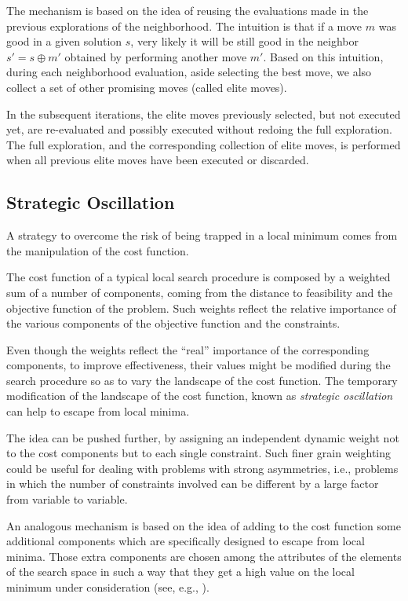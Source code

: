 The mechanism is based on the idea of reusing the evaluations made in the
previous explorations of the neighborhood. The intuition is that if a move $m$
was good in a given solution $s$, very likely it will be still good in the neighbor 
$s' = s \oplus m'$ obtained by performing another move
$m'$.  Based on this intuition, during each neighborhood evaluation, aside selecting the best move, 
we also collect a set of other promising moves (called elite moves). 

In the subsequent iterations, the elite moves previously selected, but
not executed yet, are re-evaluated and possibly executed without
redoing the full exploration. The full exploration, and the
corresponding collection of elite moves, is performed when all
previous elite moves have been executed or discarded.



\subsection{Strategic Oscillation}
\label{sec:strategic-oscillation}

A strategy to overcome the risk of being trapped in a local minimum comes from the manipulation of the cost function.

The cost function of a typical local search procedure is composed by a weighted sum of a
number of components, coming from the distance to feasibility and the objective function
of the problem.  Such weights reflect the relative importance of the
various components of the objective function and the constraints.  

Even though the weights reflect the ``real'' importance of the corresponding
components, to improve effectiveness, their values might be modified during
the search procedure so as to vary the landscape of the cost function. The
temporary modification of the landscape of the cost function, known as \emph{strategic oscillation} 
can help to escape from local minima. 

The idea can be pushed further, by assigning an independent dynamic
weight not to the cost components but to each single constraint.  Such
finer grain weighting could be useful for dealing with problems with
strong asymmetries, i.e., problems in which the number of constraints
involved can be different by a large factor from variable to variable.

An analogous mechanism is based on the idea of adding to the cost
function some additional components which are specifically designed to
escape from local minima. Those extra components are chosen among the
attributes of the elements of the search space in such a way that they
get a high value on the local minimum under
consideration (see, e.g., \cite{VoTA10}).



